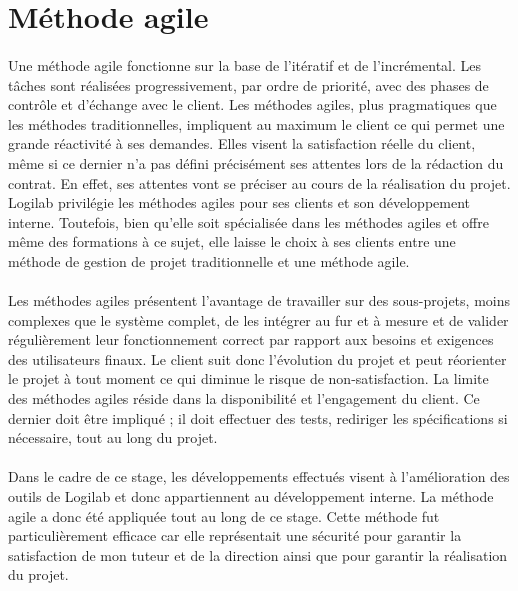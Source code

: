 \documentclass {report}
\begin{document}
\section{Méthode agile}
\paragraph{}
Une méthode agile fonctionne sur la base de l'itératif et de l’incrémental. Les tâches sont réalisées progressivement, par ordre de priorité, avec des  phases de contrôle et d’échange avec le client. Les méthodes agiles, plus pragmatiques que les méthodes traditionnelles,  impliquent au maximum le client ce qui permet une grande réactivité à ses demandes. Elles visent la satisfaction réelle du client, même si ce dernier n'a pas défini précisément ses attentes lors de la rédaction du contrat. En effet, ses attentes vont se préciser au cours de la réalisation du projet. Logilab privilégie les méthodes agiles pour ses clients et son développement interne. Toutefois, bien qu'elle soit spécialisée dans les méthodes agiles et offre même des formations à ce sujet, elle laisse le choix à ses clients entre une méthode de gestion de projet traditionnelle et une méthode agile. 
\paragraph{}
Les méthodes agiles présentent l’avantage de travailler sur des sous-projets, moins complexes que le système complet, de les intégrer au fur et à mesure et de valider régulièrement leur fonctionnement correct par rapport aux besoins et exigences des utilisateurs finaux. Le client suit donc l'évolution du projet et peut réorienter le projet à tout moment ce qui diminue le risque de non-satisfaction. La limite des méthodes agiles réside dans la disponibilité et l'engagement du client. Ce dernier doit être impliqué ; il doit effectuer des tests, rediriger les spécifications si nécessaire, tout au long du projet.

\paragraph{}
Dans le cadre de ce stage, les développements effectués visent à l'amélioration des outils de Logilab et donc appartiennent au développement interne. La méthode agile a donc été appliquée tout au long de ce stage. Cette méthode fut particulièrement efficace car elle représentait une sécurité pour garantir la satisfaction de mon tuteur et de la direction ainsi que pour garantir la réalisation du projet. 
\end{document}
